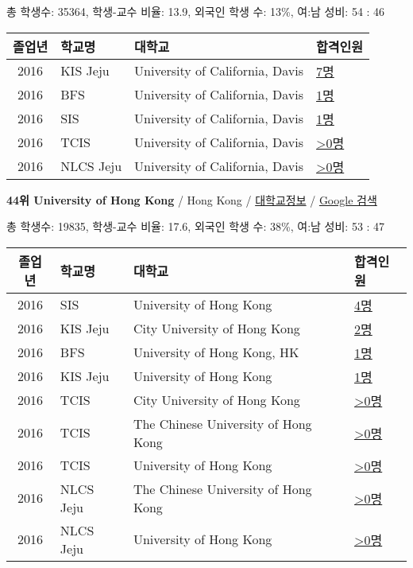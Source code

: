 \documentclass[13pt,]{article}
\begin{document}
총 학생수: 35364, 학생-교수 비율: 13.9, 외국인 학생 수: 13\%, 여:남
성비: 54 : 46

\begin{longtable}[]{@{}clll@{}}
\toprule
졸업년 & 학교명 & 대학교 & 합격인원\tabularnewline
\midrule
\endhead
2016 & KIS Jeju & University of California, Davis &
\href{http://cafe.naver.com/assarabia/11596}{7명}\tabularnewline
2016 & BFS & University of California, Davis &
\href{http://cafe.naver.com/assarabia/11597}{1명}\tabularnewline
2016 & SIS & University of California, Davis &
\href{http://cafe.naver.com/assarabia/11589}{1명}\tabularnewline
2016 & TCIS & University of California, Davis &
\href{http://cafe.naver.com/assarabia/11598}{\textgreater{}0명}\tabularnewline
2016 & NLCS Jeju & University of California, Davis &
\href{http://cafe.naver.com/assarabia/11592}{\textgreater{}0명}\tabularnewline
\bottomrule
\end{longtable}

\textbf{44위 University of Hong Kong} / Hong Kong /
\href{https://www.timeshighereducation.com/world-university-rankings/university-of-hong-kong?ranking-dataset=133819}{대학교정보}
/ \href{http://www.google.com/search?q=University+of+Hong+Kong}{Google
검색}

총 학생수: 19835, 학생-교수 비율: 17.6, 외국인 학생 수: 38\%, 여:남
성비: 53 : 47

\begin{longtable}[]{@{}clll@{}}
\toprule
졸업년 & 학교명 & 대학교 & 합격인원\tabularnewline
\midrule
\endhead
2016 & SIS & University of Hong Kong &
\href{http://cafe.naver.com/assarabia/11589}{4명}\tabularnewline
2016 & KIS Jeju & City University of Hong Kong &
\href{http://cafe.naver.com/assarabia/11596}{2명}\tabularnewline
2016 & BFS & University of Hong Kong, HK &
\href{http://cafe.naver.com/assarabia/11597}{1명}\tabularnewline
2016 & KIS Jeju & University of Hong Kong &
\href{http://cafe.naver.com/assarabia/11596}{1명}\tabularnewline
2016 & TCIS & City University of Hong Kong &
\href{http://cafe.naver.com/assarabia/11598}{\textgreater{}0명}\tabularnewline
2016 & TCIS & The Chinese University of Hong Kong &
\href{http://cafe.naver.com/assarabia/11598}{\textgreater{}0명}\tabularnewline
2016 & TCIS & University of Hong Kong &
\href{http://cafe.naver.com/assarabia/11598}{\textgreater{}0명}\tabularnewline
2016 & NLCS Jeju & The Chinese University of Hong Kong &
\href{http://cafe.naver.com/assarabia/11592}{\textgreater{}0명}\tabularnewline
2016 & NLCS Jeju & University of Hong Kong &
\href{http://cafe.naver.com/assarabia/11592}{\textgreater{}0명}\tabularnewline
\bottomrule
\end{longtable}
\end{document}
